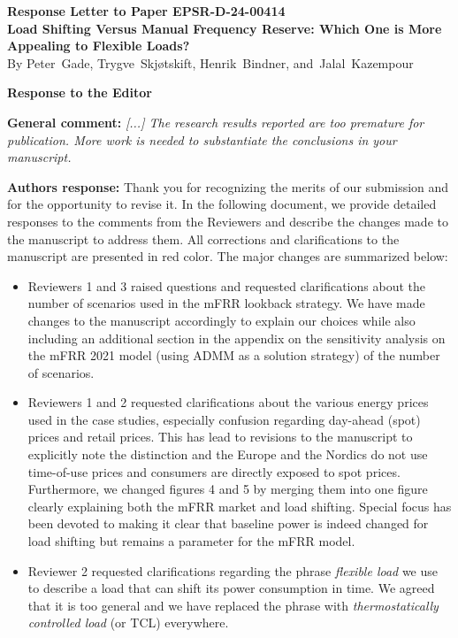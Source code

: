 \documentclass[10pt]{article}
\newcommand{\nt}[1]{\textcolor{newtextcolor}{#1}}
\newcommand{\auth}{\textbf{Authors response: }}
\begin{document}
\begin{center}
  \Large{\textbf{Response Letter to Paper EPSR-D-24-00414 \\ Load Shifting Versus Manual Frequency Reserve: Which One is More Appealing to Flexible Loads?}} \\
  \vspace{0.2cm}
  \small{By Peter~Gade,
    Trygve~Skjøtskift,
    Henrik~Bindner,
    and~Jalal~Kazempour} \\
\end{center}

\begingroup
\allowdisplaybreaks


\textbf{\large{Response to the Editor}}


\textbf{General comment:} \textit{[...] The research results reported are too premature for publication. More work is needed to substantiate the conclusions in your manuscript.}

\auth Thank you for recognizing the merits of our submission and for the opportunity to revise it. In the following document, we provide detailed responses to the comments from the Reviewers and describe the changes made to the manuscript to address them. All corrections and clarifications to the manuscript are presented in \nt{red} color. The major changes are summarized below:

\begin{itemize}
  \item Reviewers 1 and 3 raised questions and requested clarifications about the number of scenarios used in the mFRR lookback strategy. We have made changes to the manuscript accordingly to explain our choices while also including an additional section in the appendix on the sensitivity analysis on the mFRR 2021 model (using ADMM as a solution strategy) of the number of scenarios.

  \item Reviewers 1 and 2  requested clarifications about the various energy prices used in the case studies, especially confusion regarding day-ahead (spot) prices and retail prices. This has lead to revisions to the manuscript to explicitly note the distinction and the Europe and the Nordics do not use time-of-use prices and consumers are directly exposed to spot prices. Furthermore, we changed figures 4 and 5 by merging them into one figure clearly explaining both the mFRR market and load shifting. Special focus has been devoted to making it clear that baseline power is indeed changed for load shifting but remains a parameter for the mFRR model.

  \item Reviewer 2 requested clarifications regarding the phrase \textit{flexible load} we use to describe a load that can shift its power consumption in time. We agreed that it is too general and we have replaced the phrase with \textit{thermostatically controlled load} (or TCL) everywhere.
\end{itemize}
\end{document}
